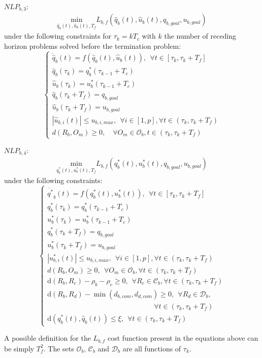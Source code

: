 \documentclass[12pt]{book}
\numberwithin{equation}{section}
\begin{document}
$NLP_{b,3}$:
\begin{align}\label{eq:costsa}
\underset{\hat{q}_b(t),\hat{u}_b(t),T_f}{\mathrm{min}} L_{b,f}(\hat{q}_b(t), \hat{u}_b(t), q_{b,goal},u_{b,goal})
\end{align}
under the following constraints for $\tau_k = kT_c$ with $k$ the number of receding horizon
problems solved before the termination problem:
\begin{equation}\label{eq:constsa}
\left\lbrace\begin{array}{lcl}
    \dot{\hat{q}}_b(t) = f(\hat{q}_b(t),\hat{u}_b(t)),\ \ \forall t \in [\tau_{k}, \tau_{k}+T_f]\\
    \hat{q}_b(\tau_{k}) = q^*_{b}(\tau_{k-1}+T_c)\\
    \hat{u}_b(\tau_{k}) = u^*_{b}(\tau_{k-1}+T_c)\\
    \hat{q}_b(\tau_{k}+T_f) = q_{b,goal}\\
    \hat{u}_b(\tau_{k}+T_f) = u_{b,goal}\\
    |\hat{u}_{b,i}(t)| \leq u_{b,i,max},\ \ \forall i \in [1,p],\forall t \in (\tau_{k}, \tau_{k}+T_f)\\
    d(R_b, O_m) \geq 0,\quad \forall O_m \in \mathcal{O}_b, t \in (\tau_{k}, \tau_{k}+T_f)
\end{array}\right.
\end{equation}

$NLP_{b,4}$:
\begin{align}\label{eq:cost}
\underset{q^*_b(t),u^*_b(t),T_f}{\mathrm{min}} L_{b,f}(q^*_b(t), u^*_b(t), q_{b,goal},u_{b,goal})
\end{align}
under the following constraints:
\begin{equation}\label{eq:const}
\left\lbrace\begin{array}{lcl}
    \dot{q^*}_b(t) = f(q^*_b(t),u^*_b(t)),\ \ \forall t \in [\tau_{k}, \tau_{k}+T_f]\\
    q^*_b(\tau_{k}) = q^*_{b}(\tau_{k-1}+T_c)\\
    u^*_b(\tau_{k}) = u^*_{b}(\tau_{k-1}+T_c)\\
    q^*_b(\tau_{k}+T_f) = q_{b,goal}\\
    u^*_b(\tau_{k}+T_f) = u_{b,goal}\\
    |u^*_{b,i}(t)| \leq u_{b,i,max},\ \ \forall i \in [1,p],\forall t \in (\tau_{k}, \tau_{k}+T_f)\\
    d(R_b, O_m) \geq 0,\ \ \forall O_m \in \mathcal{O}_b, \forall t \in (\tau_{k}, \tau_{k}+T_f)\\
    \mathrm{d}(R_b, R_c) - \rho_b - \rho_c \geq 0,\ \ \forall R_c \in \mathcal{C}_b, \forall t \in (\tau_{k}, \tau_{k}+T_f)\\
    \mathrm{d}(R_b, R_d) - \min(d_{b,com},d_{d,com}) \geq 0,\ \ \forall R_d \in \mathcal{D}_b,\\
    \quad \quad \quad \quad \quad \quad \quad \quad \quad \quad \quad \quad \quad \quad \quad \forall t \in (\tau_{k}, \tau_{k}+T_f)\\
    \mathrm{d}(q^*_b(t), \hat{q}_b(t)) \leq \xi,\ \ \forall t \in (\tau_{k}, \tau_{k}+T_f)
\end{array}\right.
\end{equation}

A possible definition for the $L_{b,f}$ cost function present in the equations above can be simply $T_f^2$.
The sets $\mathcal{O}_b$, $\mathcal{C}_b$ and $\mathcal{D}_b$ are all functions of
$\tau_k$.
\end{document}

